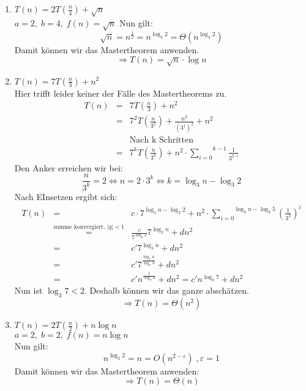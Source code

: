 \documentclass[11pt,a4paper,ngerman]{article}
\begin{document}
\begin{enumerate}[\bfseries (a)]
\item $T(n) =2 T(\frac{n}{4}) + \sqrt{n}$\\
$a= 2 , \; b = 4, \; f(n) = \sqrt{n}$
Nun gilt:
$$
\sqrt{n} = n^{\frac{1}{2}} = n^{\log_4 2} = \Theta (n^{\log_4 2})
$$
Damit können wir das Mastertheorem anwenden.
$$
\Rightarrow T(n) = \sqrt{n} \cdot \log n
$$


\item $T(n) = 7 T(\frac{n}{3}) + n^2$\\
Hier trifft leider keiner der Fälle des Mastertheorems zu.\\
$$
\begin{array}{rcl}
T(n) &=& 7 T \left( \frac{n}{3} \right) + n^2\\
&=& 7^2 T \left( \frac{n}{3^2} \right) + \frac{n^2}{(3^1)^2} + n^2\\
&& \text{Nach k Schritten}\\
&=& 7^k T \left(\frac{n}{3^k} \right) + n^2 \cdot \overset{k-1}{\underset{i=0}{\sum}} \frac{1}{3^{2\cdot i}}
\end{array}
$$
Den Anker erreichen wir bei:
$$
\frac{n}{3^k} = 2 \Leftrightarrow n = 2 \cdot 3^k \Leftrightarrow k = \log_3 n - \log_3 2
$$
Nach EInsetzen ergibt sich:
$$
\begin{array}{rcl}
T(n) &=& c \cdot 7^{\log_3 n - \log_3 2} + n^2 \cdot \overset{\log_3 n - \log_3 5}{\underset{i=0}{\sum}} \left( \frac{1}{3^{2}} \right) ^ i\\
&\stackrel{\text{summe konvergiert, }|q| < 1}{=}& \frac{c}{7^{\log_3 2}} 7^{\log_3 n} + d n^2\\
&=& c' 7^{\log_3 n} + dn^2\\
&=& c' 7^{\frac{\log_7 n}{\log_7 3}} + dn^2\\
&=& c' n^{\frac{1}{\log_7 3}} + dn^2 = c' n^{\log_3 7} + dn^2
\end{array}
$$
Nun ist $\log_3 7 < 2$. Deshalb können wir das ganze abschätzen.
$$
\Rightarrow T(n) = \Theta(n^2)
$$


\item $T(n) = 2 T(\frac{n}{2}) + n \log n$\\
$a=2, \; b=2, \; f(n) = n \log n$\\
Nun gilt:
$$
n^{\log_2 2} = n = O(n^{2-\varepsilon}) \; , \varepsilon = 1 
$$
Damit können wir das Mastertheorem anwenden:
$$
\Rightarrow T(n) = \Theta(n)
$$


\end{enumerate}
\end{document}

